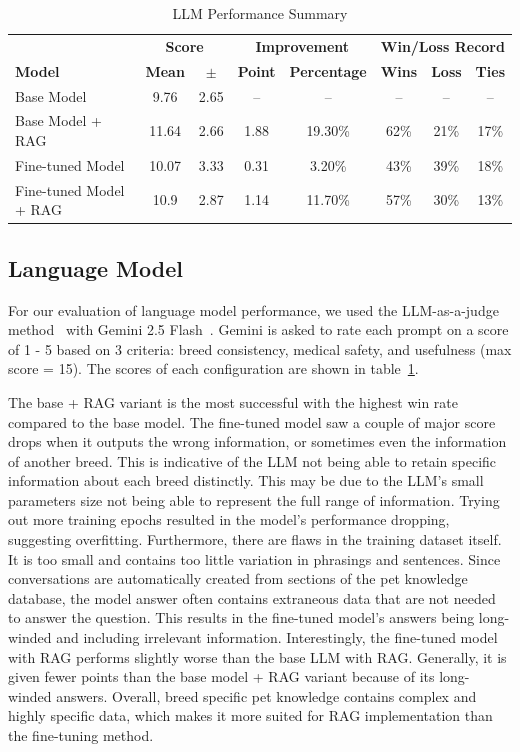 \documentclass[10pt,twocolumn,letterpaper]{article}
\begin{document}
\begin{table}[t]
\centering
\begin{tabular}{l c c | c c | c c c}
\hline
 & \multicolumn{2}{c|}{\textbf{Score}}
 & \multicolumn{2}{c|}{\textbf{Improvement}}
 & \multicolumn{3}{c}{\textbf{Win/Loss Record}} \\
\textbf{Model} & \textbf{Mean} & $\pm$
 & \textbf{Point} & \textbf{Percentage}
 & \textbf{Wins} & \textbf{Loss} & \textbf{Ties} \\
\hline
Base Model
  & 9.76 & 2.65
  & -- & --
  & -- & -- & -- \\

Base Model + RAG
  & 11.64 & 2.66
  & 1.88 & 19.30\%
  & 62\% & 21\% & 17\% \\

Fine-tuned Model
  & 10.07 & 3.33
  & 0.31 & 3.20\%
  & 43\% & 39\% & 18\% \\

Fine-tuned Model + RAG
  & 10.9 & 2.87
  & 1.14 & 11.70\%
  & 57\% & 30\% & 13\% \\
\hline
\end{tabular}
\caption{LLM Performance Summary}
\label{tab:llm_performance}
\end{table}

\subsection{Language Model}
For our evaluation of language model performance, we used the LLM-as-a-judge method~\cite{zheng2023judging} with Gemini 2.5 Flash~\cite{gemini2.5}. Gemini is asked to rate each prompt on a score of 1 - 5 based on 3 criteria: breed consistency, medical safety, and usefulness (max score = 15). The scores of each configuration are shown in table~\ref{tab:llm_performance}.

The base + RAG variant is the most successful with the highest win rate compared to the base model. The fine-tuned model saw a couple of major score drops when it outputs the wrong information, or sometimes even the information of another breed. This is indicative of the LLM not being able to retain specific information about each breed distinctly. This may be due to the LLM's small parameters size not being able to represent the full range of information. Trying out more training epochs resulted in the model's performance dropping, suggesting overfitting. Furthermore, there are flaws in the training dataset itself. It is too small and contains too little variation in phrasings and sentences. Since conversations are automatically created from sections of the pet knowledge database, the model answer often contains extraneous data that are not needed to answer the question. This results in the fine-tuned model's answers being long-winded and including irrelevant information. Interestingly, the fine-tuned model with RAG performs slightly worse than the base LLM with RAG. Generally, it is given fewer points than the base model + RAG variant because of its long-winded answers. Overall, breed specific pet knowledge contains complex and highly specific data, which makes it more suited for RAG implementation than the fine-tuning method.
\end{document}
